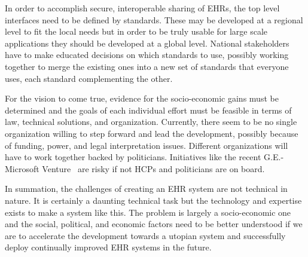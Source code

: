 \documentclass[14pt]{article}
\begin{document}

In order to accomplish secure, interoperable sharing of \glspl{EHR}, the \glspl{top level interface} need to be defined by standards. These may be developed at a regional level to fit the local needs but in order to be truly usable for large scale applications they should be developed at a global level. National stakeholders have to make educated decisions on which standards to use, possibly working together to merge the existing ones into a new set of standards that everyone uses, each standard complementing the other.

For the vision to come true, evidence for the socio-economic gains must be determined and the goals of each individual effort must be feasible in terms of law, technical solutions, and organization. Currently, there seem to be no single
organization willing to step forward and lead the development, possibly because of funding, power, and legal interpretation issues. Different organizations will have to work together backed by politicians. Initiatives like the recent G.E.-Microsoft Venture~\cite{Bits} are risky if not \glspl{HCP} and politicians are on board.

In summation, the challenges of creating an \gls{EHR} system are not technical in nature. It is certainly a daunting technical task but the technology and expertise exists to make a system like this. The problem is largely a socio-economic one and the social, political, and economic factors need to be better understood if we are to accelerate the development towards a utopian system and successfully deploy continually improved \gls{EHR} systems in the future.

\newpage
\printglossaries
\newpage

\begin{appendix}
\end{appendix}



 
 
\end{document}
